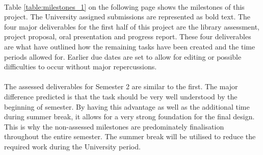 \paragraph{}
Table \ref{table:milestones_1} on the following page shows the milestones of this project. The University assigned submissions are represented as bold text. The four major deliverables for the first half of this project are the library assessment, project proposal, oral presentation and progress report. These four deliverables are what have outlined how the remaining tasks have been created and the time periods allowed for. Earlier due dates are set to allow for editing or possible difficulties to occur without major repercussions. 

\paragraph{}
The assessed deliverables for Semester 2 are similar to the first. The major difference predicted is that the task should be very well understood by the beginning of semester. By having this advantage as well as the additional time during summer break, it allows for a very strong foundation for the final design. This is why the non-assessed milestones are predominately finalisation throughout the entire semester. The summer break will be utilised to reduce the required work during the University period. 


